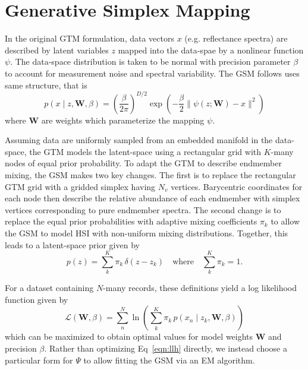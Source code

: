 \documentclass[remotesensing,article,submit,pdftex,moreauthors]{Definitions/mdpi}
\begin{document}
\section{Generative Simplex Mapping}\label{sec:gsm}

In the original GTM formulation, data vectors $x$ (e.g. reflectance spectra) are described by latent variables $z$ mapped into the data-spae by a nonlinear function $\psi$. The data-space distribution is taken to be normal with precision parameter $\beta$ to account for measurement noise and spectral variability. The GSM follows uses same structure, that is
\begin{equation}\label{eqn:data-space-distribution}
    p(x \mid z, \mathbf{W}, \beta) = \left(\frac{\beta}{2\pi} \right)^{D/2}\exp\left( -\frac{\beta}{2}\lVert \psi(z; \mathbf{W}) - x \rVert^2 \right)
\end{equation}
where $\mathbf{W}$ are weights which parameterize the mapping $\psi$.

Assuming data are uniformly sampled from an embedded manifold in the data-space, the GTM models the latent-space using a rectangular grid with $K$-many nodes of equal prior probability. To adapt the GTM to describe endmember mixing, the GSM makes two key changes. The first is to replace the rectangular GTM grid with a gridded simplex having $N_v$ vertices. Barycentric coordinates for each node then describe the relative abundance of each endmember with simplex vertices corresponding to pure endmember spectra. The second change is to replace the equal prior probabilities with adaptive mixing coefficients $\pi_k$ to allow the GSM to model HSI with non-uniform mixing distributions. Together, this leads to a latent-space prior given by
\begin{equation}\label{eqn:latent-distribution}
    p(z) = \sum\limits_k^K \pi_k \, \delta(z - z_k) \quad\text{where}\quad  \sum_k^K\pi_k = 1.
\end{equation}

For a dataset containing $N$-many records, these definitions yield a log likelihood function given by
\begin{equation}\label{eqn:llh}
    \mathcal{L}(\mathbf{W}, \beta) = \sum\limits_n^N \ln \left( \sum\limits_k^K \pi_k \, p(x_n \mid z_k, \mathbf{W}, \beta) \right)
\end{equation}
which can be maximized to obtain optimal values for model weights $\mathbf{W}$ and precision $\beta$. Rather than optimizing Eq~\ref{eqn:llh} directly, we instead choose a particular form for $\Psi$ to allow fitting the GSM via an EM algorithm.
\end{document}
